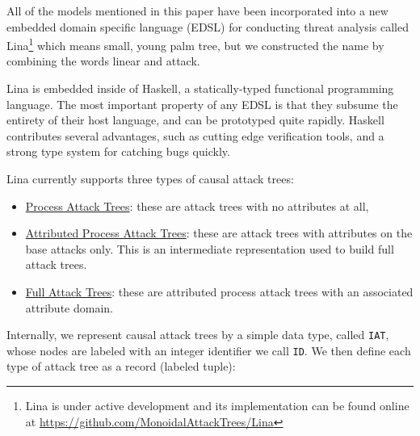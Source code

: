 All of the models mentioned in this paper have been incorporated into
a new embedded domain specific language (EDSL) for conducting threat
analysis called Lina\footnote{Lina is under active development and its
  implementation can be found online at
  \url{https://github.com/MonoidalAttackTrees/Lina}} which means
small, young palm tree, but we constructed the name by combining the
words linear and attack.
 
Lina is embedded inside of Haskell, a statically-typed functional
programming language.  The most important property of any EDSL is that
they subsume the entirety of their host language, and can be
prototyped quite rapidly.  Haskell contributes several advantages,
such as cutting edge verification tools, and a strong type system for
catching bugs quickly.  

Lina currently supports three types of causal attack trees:
\begin{itemize}
\item \underline{Process Attack Trees}: these are attack trees with no attributes
  at all,
  
\item \underline{Attributed Process Attack Trees}: these are attack trees with
  attributes on the base attacks only.  This is an intermediate
  representation used to build full attack trees.
  
\item \underline{Full Attack Trees}: these are attributed process attack trees
  with an associated attribute domain.
\end{itemize}
\newcommand{\mh}[1]{\texttt{#1}} Internally, we represent
causal attack trees by a simple data type, called \mh{IAT}, whose
nodes are labeled with an integer identifier we call \mh{ID}.  We then
define each type of attack tree as a record (labeled tuple):

